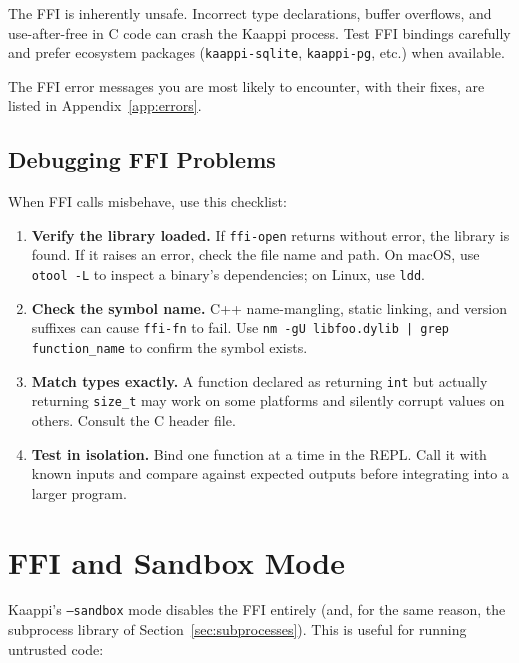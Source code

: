 \begin{warning}
The FFI is inherently unsafe. Incorrect type declarations, buffer overflows, and use-after-free in C code can crash the Kaappi process. Test FFI bindings carefully and prefer ecosystem packages (\texttt{kaappi-sqlite}, \texttt{kaappi-pg}, etc.) when available.
\end{warning}

The FFI error messages you are most likely to encounter, with their fixes, are listed in Appendix~\ref{app:errors}.

\subsection{Debugging FFI Problems}

When FFI calls misbehave, use this checklist:

\begin{enumerate}
    \item \textbf{Verify the library loaded.} If \texttt{ffi-open} returns without error, the library is found. If it raises an error, check the file name and path. On macOS, use \texttt{otool -L} to inspect a binary's dependencies; on Linux, use \texttt{ldd}.
    \item \textbf{Check the symbol name.} C++ name-mangling, static linking, and version suffixes can cause \texttt{ffi-fn} to fail. Use \texttt{nm -gU libfoo.dylib | grep function\_name} to confirm the symbol exists.
    \item \textbf{Match types exactly.} A function declared as returning \texttt{int} but actually returning \texttt{size\_t} may work on some platforms and silently corrupt values on others. Consult the C header file.
    \item \textbf{Test in isolation.} Bind one function at a time in the REPL. Call it with known inputs and compare against expected outputs before integrating into a larger program.
\end{enumerate}

\section{FFI and Sandbox Mode}

Kaappi's \texttt{--sandbox} mode disables the FFI entirely (and, for the same reason, the subprocess library of Section~\ref{sec:subprocesses}). This is useful for running untrusted code:

